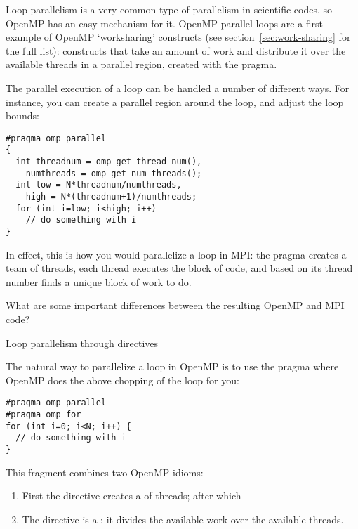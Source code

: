 
Loop parallelism is a very common type of parallelism in scientific
codes, so OpenMP has an easy mechanism for it.
OpenMP parallel loops are a first example of OpenMP `worksharing'
constructs (see section~\ref{sec:work-sharing} for the full list):
constructs that take an amount of work and distribute it over the
available threads in a parallel region,
created with the  pragma.

The parallel execution of a loop can be handled a number of different ways.
For instance, you can create a parallel region around the loop, and
adjust the loop bounds:
\begin{lstlisting}
#pragma omp parallel
{
  int threadnum = omp_get_thread_num(),
    numthreads = omp_get_num_threads();
  int low = N*threadnum/numthreads,
    high = N*(threadnum+1)/numthreads;
  for (int i=low; i<high; i++)
    // do something with i
}
\end{lstlisting}
In effect, this is how you would parallelize a loop in MPI:
the  pragma creates a team of threads,
each thread executes the block of code,
and based on its thread number finds a unique block of work to do.

\begin{exercise}
  What are some important differences between the resulting OpenMP and MPI code?
\end{exercise}

 {Loop parallelism through directives}
\label{sec:omp-for}

The natural way to parallelize a loop in OpenMP
is to use the
 pragma
where OpenMP does the above chopping of the loop
for you:
\begin{lstlisting}
#pragma omp parallel
#pragma omp for
for (int i=0; i<N; i++) {
  // do something with i
}
\end{lstlisting}

This fragment combines two OpenMP idioms:
\begin{enumerate}
\item First the  directive
  creates a  of threads; after which
\item The  directive is a
  :
  it divides the available work over the available threads.
\end{enumerate}

